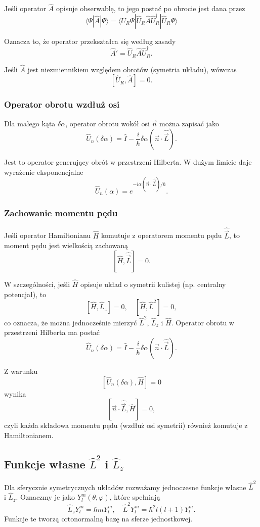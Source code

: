 Jeśli operator $\hat{A}$ opisuje obserwablę, to jego postać po obrocie jest dana przez
$$
\langle \Psi | \hat{A} | \Psi \rangle = \langle \hat{U}_R \Psi | \hat{U}_R \hat{A} \hat{U}_R^\dagger | \hat{U}_R \Psi \rangle
$$

Oznacza to, że operator przekształca się według zasady
$$
\hat{A}' = \hat{U}_R \hat{A} \hat{U}_R^\dagger.
$$

Jeśli $\hat{A}$ jest niezmiennikiem względem obrotów (symetria układu), wówczas
$$
[\hat{U}_R, \hat{A}] = 0.
$$

\subsubsection*{Operator obrotu wzdłuż osi}
Dla małego kąta $\delta\alpha$, operator obrotu wokół osi $\vec{n}$ można zapisać jako
$$
\hat{U}_n(\delta\alpha) = \hat{I} - \frac{i}{\hbar} \delta\alpha (\vec{n} \cdot \hat{\vec{L}}).
$$

Jest to operator generujący obrót w przestrzeni Hilberta. W dużym limicie daje wyrażenie eksponencjalne
$$
\hat{U}_n(\alpha) = e^{-i \alpha (\vec{n} \cdot \hat{\vec{L}})/\hbar}.
$$

\subsubsection*{Zachowanie momentu pędu}
Jeśli operator Hamiltonianu $\hat{H}$ komutuje z operatorem momentu pędu $\hat{\vec{L}}$, to moment pędu jest wielkością zachowaną
$$
[\hat{H}, \hat{\vec{L}}] = 0.
$$

W szczególności, jeśli $\hat{H}$ opisuje układ o symetrii kulistej (np. centralny potencjał), to
$$
[\hat{H}, \hat{L}_z] = 0, \quad [\hat{H}, \hat{L}^2] = 0,
$$
co oznacza, że można jednocześnie mierzyć $\hat{L}^2$, $\hat{L}_z$ i $\hat{H}$. Operator obrotu w przestrzeni Hilberta ma postać
$$
\hat{U}_n(\delta \alpha) = \hat{I} - \frac{i}{\hbar} \delta \alpha (\vec{n} \cdot \hat{\vec{L}}).
$$

Z warunku
$$
[\hat{U}_n(\delta \alpha), \hat{H}] = 0
$$
wynika
$$
[\vec{n} \cdot \hat{\vec{L}}, \hat{H}] = 0,
$$
czyli każda składowa momentu pędu (wzdłuż osi symetrii) również komutuje z Hamiltonianem.

\subsection{Funkcje własne $\hat{L}^2$ i $\hat{L}_z$}

Dla sferycznie symetrycznych układów rozważamy jednoczesne funkcje własne $\hat{L}^2$ i $\hat{L}_z$. Oznaczmy je jako $Y_{l}^{m}(\theta, \varphi)$, które spełniają
$$
\hat{L}_z Y_{l}^{m} = \hbar m Y_{l}^{m}, \quad \hat{L}^2 Y_{l}^{m} = \hbar^2 l(l+1) Y_{l}^{m}.
$$
Funkcje te tworzą ortonormalną bazę na sferze jednostkowej.

